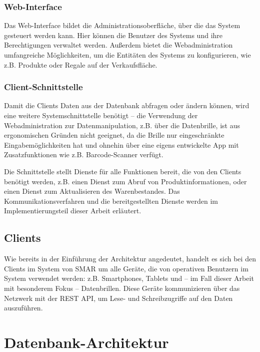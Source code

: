 \subsubsection{Web-Interface}
Das Web-Interface bildet die Administrationsoberfläche, über die das System gesteuert werden kann. Hier können die Benutzer des Systems und ihre Berechtigungen verwaltet werden. Außerdem bietet die Webadministration umfangreiche Möglichkeiten, um die Entitäten des Systems zu konfigurieren, wie z.B. Produkte oder Regale auf der Verkaufsfläche.

\subsubsection{Client-Schnittstelle}
Damit die Clients Daten aus der Datenbank abfragen oder ändern können, wird eine weitere Systemschnittstelle benötigt -- die Verwendung der Webadministration zur Datenmanipulation, z.B. über die Datenbrille, ist aus ergonomischen Gründen nicht geeignet, da die Brille nur eingeschränkte Eingabemöglichkeiten hat und ohnehin über eine eigens entwickelte App mit Zusatzfunktionen wie z.B. Barcode-Scanner verfügt.

Die Schnittstelle stellt Dienste für alle Funktionen bereit, die von den Clients benötigt werden, z.B. einen Dienst zum Abruf von Produktinformationen, oder einen Dienst zum Aktualisieren des Warenbestandes. Das Kommunikationsverfahren und die bereitgestellten Dienste werden im Implementierungsteil dieser Arbeit erläutert.

\subsection{Clients}
Wie bereits in der Einführung der Architektur angedeutet, handelt es sich bei den Clients im System von \acs{SMAR} um alle Geräte, die von operativen Benutzern im System verwendet werden: z.B. Smartphones, Tablets und -- im Fall dieser Arbeit mit besonderem Fokus -- Datenbrillen. Diese Geräte kommunizieren über das Netzwerk mit der \acs{REST} \acs{API}, um Lese- und Schreibzugriffe auf den Daten auszuführen.

\section{Datenbank-Architektur}
\label{sec:architektur_datenbank}

